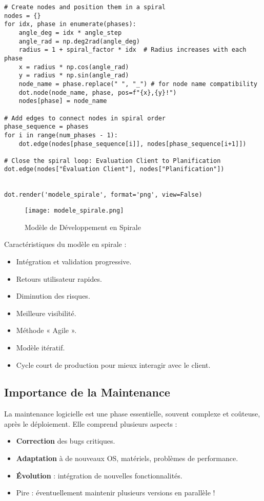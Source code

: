 \documentclass{article}
\begin{document}
\begin{itemize}
\begin{verbatim}
# Create nodes and position them in a spiral
nodes = {}
for idx, phase in enumerate(phases):
    angle_deg = idx * angle_step
    angle_rad = np.deg2rad(angle_deg)
    radius = 1 + spiral_factor * idx  # Radius increases with each phase
    x = radius * np.cos(angle_rad)
    y = radius * np.sin(angle_rad)
    node_name = phase.replace(" ", "_") # for node name compatibility
    dot.node(node_name, phase, pos=f"{x},{y}!")
    nodes[phase] = node_name

# Add edges to connect nodes in spiral order
phase_sequence = phases
for i in range(num_phases - 1):
    dot.edge(nodes[phase_sequence[i]], nodes[phase_sequence[i+1]])

# Close the spiral loop: Evaluation Client to Planification
dot.edge(nodes["Évaluation Client"], nodes["Planification"])


dot.render('modele_spirale', format='png', view=False)
\end{verbatim}

\begin{figure}[H]
    \centering
    \texttt{[image: modele\_spirale.png]}
    \caption{Modèle de Développement en Spirale}
    \label{fig:modele_spirale}
\end{figure}

\noindent Caractéristiques du modèle en spirale :

\begin{itemize}
    \item Intégration et validation progressive.
    \item Retours utilisateur rapides.
    \item Diminution des risques.
    \item Meilleure visibilité.
    \item Méthode « Agile ».
    \item Modèle itératif.
    \item Cycle court de production pour mieux interagir avec le client.
\end{itemize}

\subsection{Importance de la Maintenance}

La maintenance logicielle est une phase essentielle, souvent complexe et coûteuse, après le déploiement.  Elle comprend plusieurs aspects :

\begin{itemize}
    \item \textbf{Correction} des bugs critiques.
    \item \textbf{Adaptation} à de nouveaux OS, matériels, problèmes de performance.
    \item \textbf{Évolution} : intégration de nouvelles fonctionnalités.
    \item Pire : éventuellement maintenir plusieurs versions en parallèle !
\end{itemize}


\end{itemize}
\end{document}
